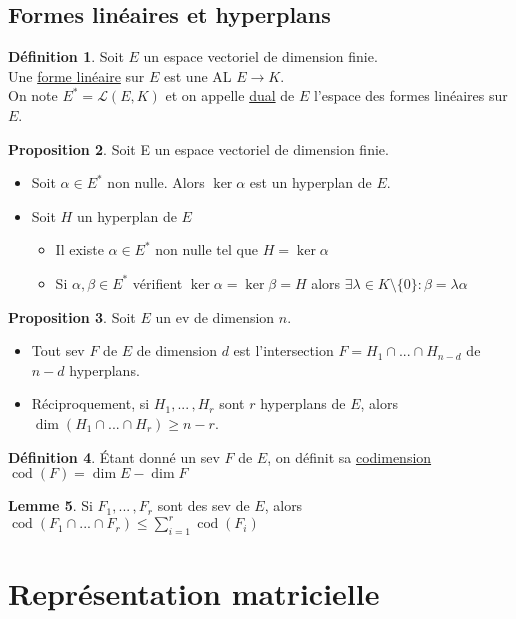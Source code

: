 \documentclass[10pt,a4paper]{article}
\theoremstyle{definition}
\newtheorem{proposition}{Proposition}[section]
\newtheorem{lemme}[proposition]{Lemme}
\newtheorem{definition}[proposition]{Définition}
\DeclareMathOperator{\cod}{cod}
\begin{document}
\subsection{Formes linéaires et hyperplans}
\begin{definition}
Soit $E$ un espace vectoriel de dimension finie. \\
Une \uline{forme linéaire} sur $E$ est une AL $E \to K$. \\
On note $E^* = \mathcal{L}(E, K)$ et on appelle \uline{dual} de $E$ l'espace des formes linéaires sur $E$.
\end{definition}
\begin{proposition}
Soit E un espace vectoriel de dimension finie.
\begin{itemize}
\item Soit $\alpha \in E^*$ non nulle. Alors $\ker \alpha$ est un hyperplan de $E$.
\item Soit $H$ un hyperplan de $E$
\begin{itemize}
\item Il existe $\alpha \in E^*$ non nulle tel que $H = \ker \alpha$
\item Si $\alpha, \beta \in E^*$ vérifient $\ker \alpha = \ker \beta = H$ alors $\exists \lambda \in K \setminus \{0\} : \beta = \lambda \alpha$
\end{itemize}
\end{itemize}
\end{proposition}
\begin{proposition}
Soit $E$ un ev de dimension $n$.
\begin{itemize}
\item Tout sev $F$ de $E$ de dimension $d$ est l'intersection $F = H_1 \cap ... \cap H_{n - d}$ de $n - d$ hyperplans.
\item Réciproquement, si $H_1, ...\, , H_r$ sont $r$ hyperplans de $E$, alors $\dim (H_1 \cap ... \cap H_r) \geq n - r$.
\end{itemize}
\end{proposition}
\begin{definition}
Étant donné un sev $F$ de $E$, on définit sa \uline{codimension} $\cod (F) = \dim E - \dim F$
\end{definition}
\begin{lemme}
Si $F_1, ...\, , F_r$ sont des sev de $E$, alors $\cod (F_1 \cap ... \cap F_r) \leq \sum\limits_{i = 1}^{r} \cod (F_i)$
\end{lemme}

\section{Représentation matricielle}
\end{document}
